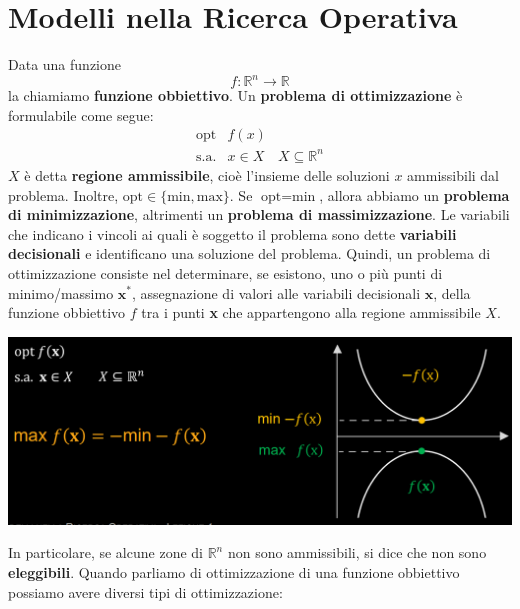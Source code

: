 \documentclass[12pt]{article}
\begin{document}
\section{Modelli nella Ricerca Operativa}
Data una funzione
$$f: \mathbb{R}^n \rightarrow \mathbb{R}$$
la chiamiamo \textbf{funzione obbiettivo}.
Un \textbf{problema di ottimizzazione} è formulabile come segue:
\begin{equation*}
    \begin{array}{rrclcl}
    \displaystyle \textrm{opt} & f(x)\\
    \textrm{s.a.} & x \in X & X \subseteq \mathbb{R}^n
    \end{array}
\end{equation*}
$X$ è detta \textbf{regione ammissibile}, cioè l'insieme delle soluzioni $x$ ammissibili dal problema. Inoltre, $\textrm{opt} \in \{\textrm{min}, \textrm{max}\}$. \newline
Se $\textrm{opt} = \textrm{min}$, allora abbiamo un \textbf{problema di minimizzazione}, altrimenti un \textbf{problema di massimizzazione}. \newline
Le variabili che indicano i vincoli ai quali è soggetto il problema sono dette \textbf{variabili decisionali} e identificano una soluzione del problema. \newline
Quindi, un problema di ottimizzazione consiste nel determinare, se esistono, uno o più punti di minimo/massimo $\textbf{x}^*$, assegnazione di valori alle variabili decisionali $\textbf{x}$, della funzione obbiettivo $f$ tra i punti
\textbf{x} che appartengono alla regione ammissibile $X$.
\begin{center}
    \includegraphics[width = 1\textwidth]{Images/5.PNG}
\end{center}
In particolare, se alcune zone di $\mathbb{R}^n$ non sono ammissibili, si dice che non sono \textbf{eleggibili}. \newline
Quando parliamo di ottimizzazione di una funzione obbiettivo possiamo avere diversi tipi di ottimizzazione: \newline 
\end{document}
